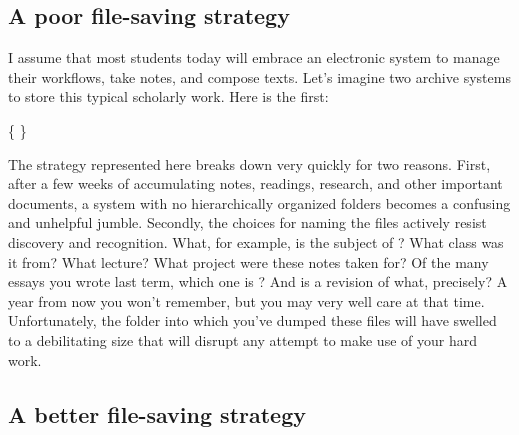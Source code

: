 \subsection{A poor file-saving strategy}

I assume that most students today will embrace an electronic system to manage their workflows, take notes, and compose texts. Let's imagine two archive systems to store this typical scholarly work. Here is the first:

\medskip

{\large
{}  
}
 
\begin{center} \{  \} \end{center}

\noindent The strategy represented here breaks down very quickly for two reasons. First, after a few weeks of accumulating notes, readings, research, and other important documents, a system with no hierarchically organized folders becomes a confusing and unhelpful jumble. Secondly, the choices for naming the files actively resist discovery and recognition. What, for example, is the subject of ? What class was it from? What lecture? What project were these notes taken for? Of the many essays you wrote last term, which one is ? And  is a revision of what, precisely? A year from now you won't remember, but you may very well care at that time. Unfortunately, the folder into which you've dumped these files will have swelled to a debilitating size that will disrupt any attempt to make use of your hard work. 

\subsection{A better file-saving strategy}

